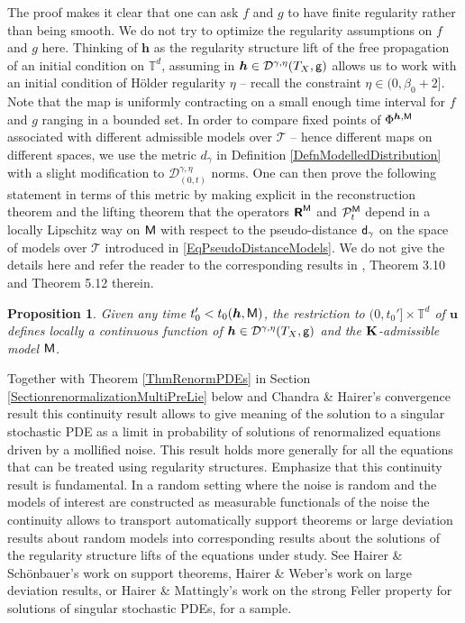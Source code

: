 \documentclass[10pt, reqno]{amsart}
\numberwithin{subsection}{section}
\numberwithin{subsubsection}{subsection}
\numberwithin{equation}{section} %
\theoremstyle{mystyle}
\newtheorem{prop}[thm]{\hspace{-0.13cm} {Proposition}}%
\theoremstyle{mystyle2}
\theoremstyle{mystyle3}
\newcommand{\bsh}{\boldsymbol{h}}
\newcommand{\bsu}{\boldsymbol{u}}
\newcommand{\bbT}{\mathbb{T}}
\newcommand{\mcD}{\mathcal{D}}
\newcommand{\mcP}{\mathcal{P}}
\begin{document}
\medskip

The proof makes it clear that one can ask $f$ and $g$ to have finite regularity rather than being smooth. We do not try to optimize the regularity assumptions on $f$ and $g$ here. Thinking of $\bsh$ as the regularity structure lift of the free propagation of an initial condition on $\bbT^d$, assuming in $\bsh\in\mcD^{\gamma,\eta}(T_X,\sf g)$ allows us to work with an initial condition of H\"older regularity $\eta$ -- recall the constraint $\eta\in(0,\beta_0+2]$. Note that the map is uniformly contracting on a small enough time interval for $f$ and $g$ ranging in a bounded set. In order to compare fixed points of $\Phi^{\bsh,{\sf M}}$ associated with different admissible models over $\mathscr{T}$ -- hence different maps on different spaces, we use the metric $d_\gamma$ in Definition \ref{DefnModelledDistribution} with a slight modification to $\mcD_{(0,t)}^{\gamma,\eta}$ norms.
One can then prove the following statement in terms of this metric by making explicit in the reconstruction theorem and the lifting theorem that the operators $\textbf{\textsf{R}}^{\sf M}$ and $\mcP_t^{\sf M}$ depend in a locally Lipschitz way on $\sf M$ with respect to the pseudo-distance ${\sf d}_\gamma$ on the space of models over $\mathscr{T}$ introduced in \eqref{EqPseudoDistanceModels}. We do not give the details here and refer the reader to the corresponding results in \cite{Hai14}, Theorem 3.10 and Theorem 5.12 therein.

\medskip

\begin{prop}
Given any time $t_0'<t_0(\bsh,\sf M)$, the restriction to $(0,t_0']\times\bbT^d$ of $\bsu$ defines locally a continuous function of $\bsh\in\mcD^{\gamma,\eta}(T_X,{\sf g})$ and the $\bf K$-admissible model $\sf M$.
\end{prop}

\medskip

Together with Theorem \ref{ThmRenormPDEs} in Section \ref{SectionrenormalizationMultiPreLie} below and Chandra \& Hairer's convergence result \cite{ChandraHairer} this continuity result allows to give meaning of the solution to a singular stochastic PDE as a limit in probability of solutions of renormalized equations driven by a mollified noise. This result holds more generally for all the equations that can be treated using regularity structures. Emphasize that this continuity result is fundamental. In a random setting where the noise is random and the models of interest are constructed as measurable functionals of the noise the continuity allows to transport automatically support theorems or large deviation results about random models into corresponding results about the solutions of the regularity structure lifts of the equations under study. See Hairer \& Sch\"onbauer's work \cite{HairerSchonbauer} on support theorems, Hairer \& Weber's work \cite{HairerWeber} on large deviation results, or Hairer \& Mattingly's work \cite{HairerMattingly} on the strong Feller property for solutions of singular stochastic PDEs, for a sample.   
\end{document}
